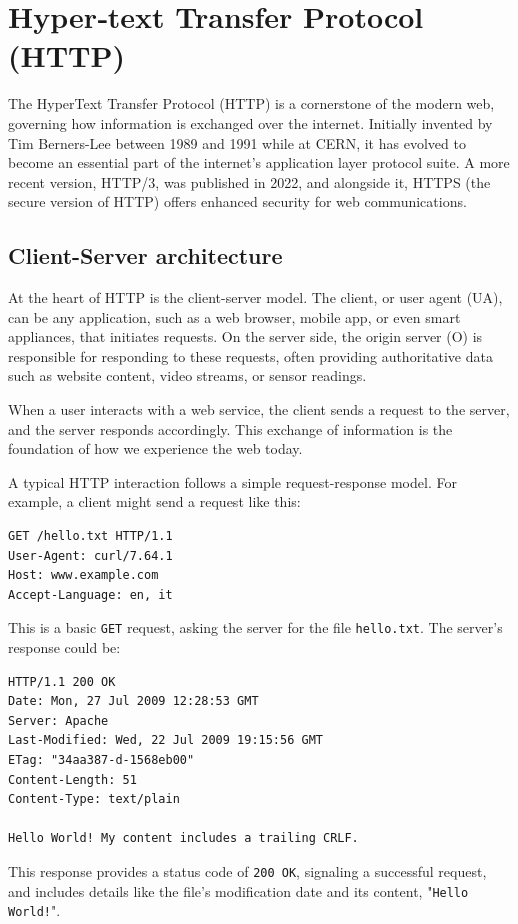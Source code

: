 \section{Hyper‑text Transfer Protocol (HTTP)}
The HyperText Transfer Protocol (HTTP) is a cornerstone of the modern web, governing how information is exchanged over the internet. Initially invented by Tim Berners-Lee between 1989 and 1991 while at CERN, it has evolved to become an essential part of the internet’s application layer protocol suite. A more recent version, HTTP/3, was published in 2022, and alongside it, HTTPS (the secure version of HTTP) offers enhanced security for web communications.

\subsection*{Client-Server architecture}
At the heart of HTTP is the client-server model. The client, or user agent (UA), can be any application, such as a web browser, mobile app, or even smart appliances, that initiates requests. On the server side, the origin server (O) is responsible for responding to these requests, often providing authoritative data such as website content, video streams, or sensor readings.

When a user interacts with a web service, the client sends a request to the server, and the server responds accordingly. This exchange of information is the foundation of how we experience the web today.

A typical HTTP interaction follows a simple request-response model. For example, a client might send a request like this:

\lstset{basicstyle=\ttfamily, breaklines=true}

\begin{lstlisting}
GET /hello.txt HTTP/1.1
User-Agent: curl/7.64.1
Host: www.example.com
Accept-Language: en, it
\end{lstlisting}
This is a basic \texttt{GET} request, asking the server for the file \texttt{hello.txt}. The server's response could be:

\begin{lstlisting}
HTTP/1.1 200 OK
Date: Mon, 27 Jul 2009 12:28:53 GMT
Server: Apache
Last-Modified: Wed, 22 Jul 2009 19:15:56 GMT
ETag: "34aa387-d-1568eb00"
Content-Length: 51
Content-Type: text/plain

Hello World! My content includes a trailing CRLF.
\end{lstlisting}
This response provides a status code of \texttt{200 OK}, signaling a successful request, and includes details like the file’s modification date and its content, "\texttt{Hello World!}".


